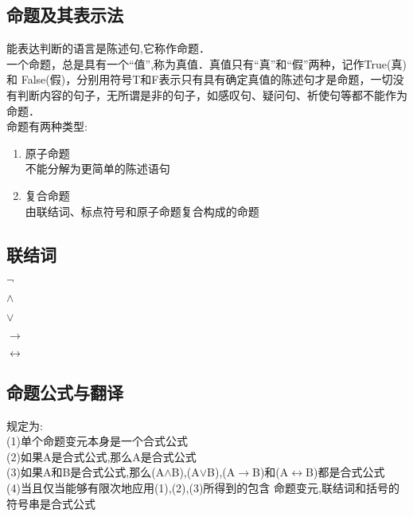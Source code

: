 \subsection{命题及其表示法}



\begin{definition}{}
能表达判断的语言是陈述句,它称作命题．\\ 
 一个命题，总是具有一个“值”,称为真值．真值只有“真”和“假”两种，记作True(真)和 False(假)，分别用符号T和F表示只有具有确定真值的陈述句才是命题，一切没有判断内容的句子，无所谓是非的句子，如感叹句、疑问句、祈使句等都不能作为命题．
\\
命题有两种类型:
\begin{enumerate}
\item 原子命题\\不能分解为更简单的陈述语句
\item 复合命题\\由联结词、标点符号和原子命题复合构成的命题
\end{enumerate} 
\end{definition}




\subsection{联结词}
\begin{definition}[否定] $\neg$ \end{definition} 
\begin{definition}[合取] $\wedge$ \end{definition} 
\begin{definition}[析取] $\vee$ \end{definition} 
\begin{definition}[条件] $\rightarrow$ \end{definition} 
\begin{definition}[双条件] $\leftrightarrow$ \end{definition} 
\subsection{命题公式与翻译}
\begin{definition} 
规定为:\\ \indent 
(1)单个命题变元本身是一个合式公式\\ \indent 
(2)如果A是合式公式,那么A是合式公式\\ \indent 
(3)如果A和B是合式公式,那么(A$\wedge$B),(A$\vee$B),(A$\rightarrow$B)和(A$\leftrightarrow$B)都是合式公式\\ \indent 
(4)当且仅当能够有限次地应用(1),(2),(3)所得到的包含
命题变元,联结词和括号的符号串是合式公式\\
\end{definition} 
